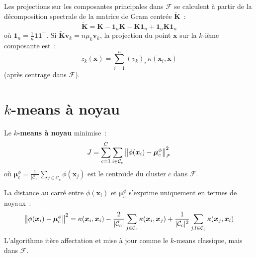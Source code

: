 \begin{proposition}
Les projections sur les composantes principales dans $\mathcal{F}$ se
calculent \`a partir de la d\'ecomposition spectrale de la matrice de
Gram centr\'ee $\tilde{\bm{K}}$~:
\begin{equation}
  \tilde{\bm{K}} = \bm{K} - \bm{1}_n \bm{K} - \bm{K} \bm{1}_n
  + \bm{1}_n \bm{K} \bm{1}_n
\end{equation}
o\`u $\bm{1}_n = \frac{1}{n}\bm{1}\bm{1}^\top$. Si $\tilde{\bm{K}}
\bm{v}_k = n \mu_k \bm{v}_k$, la projection du point $\bm{x}$ sur
la $k$-i\`eme composante est~:
\begin{equation}
  z_k(\bm{x}) = \sum_{i=1}^n (v_k)_i\,
  \kappa(\bm{x}_i, \bm{x})
\end{equation}
(apr\`es centrage dans $\mathcal{F}$).
\end{proposition}

\section{$k$-means \`a noyau}
\label{sec:kernel-kmeans}

\begin{definition}
Le \textbf{$k$-means \`a noyau} minimise~:
\begin{equation}
  J = \sum_{c=1}^C \sum_{i \in \mathcal{C}_c}
  \left\| \phi(\bm{x}_i) - \bm{\mu}_c^{\phi} \right\|^2_{\mathcal{F}}
\end{equation}
o\`u $\bm{\mu}_c^{\phi} = \frac{1}{|\mathcal{C}_c|}
\sum_{j \in \mathcal{C}_c} \phi(\bm{x}_j)$ est le centro\"ide du
cluster $c$ dans $\mathcal{F}$.
\end{definition}

\begin{formules}[title=\textbf{Calcul des distances dans $\mathcal{F}$}]
La distance au carr\'e entre $\phi(\bm{x}_i)$ et $\bm{\mu}_c^{\phi}$
s'exprime uniquement en termes de noyaux~:
\begin{equation}
  \left\| \phi(\bm{x}_i) - \bm{\mu}_c^{\phi} \right\|^2 =
  \kappa(\bm{x}_i, \bm{x}_i) -
  \frac{2}{|\mathcal{C}_c|} \sum_{j \in \mathcal{C}_c}
  \kappa(\bm{x}_i, \bm{x}_j) +
  \frac{1}{|\mathcal{C}_c|^2} \sum_{j, l \in \mathcal{C}_c}
  \kappa(\bm{x}_j, \bm{x}_l)
\end{equation}
L'algorithme it\`ere affectation et mise \`a jour comme le $k$-means
classique, mais dans $\mathcal{F}$.
\end{formules}


